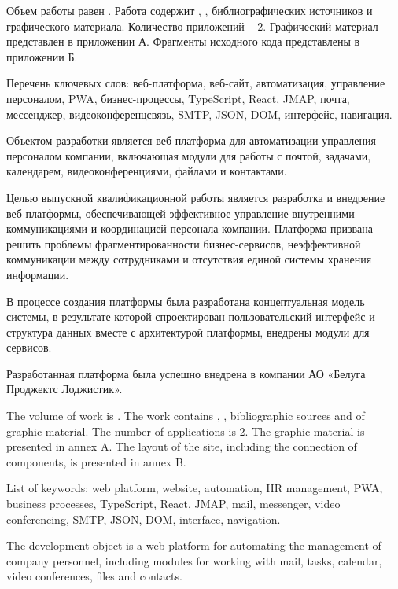 
Объем работы равен . Работа содержит , ,  библиографических источников и  графического материала. Количество приложений – 2. Графический материал представлен в приложении А. Фрагменты исходного кода представлены в приложении Б.

Перечень ключевых слов: веб-платформа, веб-сайт, автоматизация, управление персоналом, PWA, бизнес-процессы, TypeScript, React, JMAP, почта, мессенджер, видеоконференцсвязь, SMTP, JSON, DOM, интерфейс, навигация.

Объектом разработки является веб-платформа для автоматизации управления персоналом компании, включающая модули для работы с почтой, задачами, календарем, видеоконференциями, файлами и контактами.

Целью выпускной квалификационной работы является разработка и внедрение веб-платформы, обеспечивающей эффективное управление внутренними коммуникациями и координацией персонала компании. Платформа призвана решить проблемы фрагментированности бизнес-сервисов, неэффективной коммуникации между сотрудниками и отсутствия единой системы хранения информации.

В процессе создания платформы была разработана концептуальная модель системы, в результате которой спроектирован пользовательский интерфейс и структура данных вместе с архитектурой платформы, внедрены модули для сервисов. 

Разработанная платформа была успешно внедрена в компании АО «Белуга Проджектс Лоджистик».

  
The volume of work is . The work contains , ,  bibliographic sources and  of graphic material. The number of applications is 2. The graphic material is presented in annex A. The layout of the site, including the connection of components, is presented in annex B.

List of keywords: web platform, website, automation, HR management, PWA, business processes, TypeScript, React, JMAP, mail, messenger, video conferencing, SMTP, JSON, DOM, interface, navigation.

The development object is a web platform for automating the management of company personnel, including modules for working with mail, tasks, calendar, video conferences, files and contacts.

